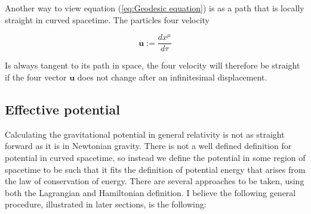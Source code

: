 \documentclass{article}
\begin{document}
Another way to view equation (\ref{eq:Geodesic equation}) is as a path that is locally straight in curved spacetime. The particles four velocity

\begin{equation}\label{eq:Four velocity}
    \boldsymbol{u} := \frac{dx^\mu}{d\tau}
\end{equation}

Is always tangent to its path in space, the four velocity will therefore be straight if the four vector $\boldsymbol{u}$ does not change after an infinitesimal displacement.

    



\subsection{Effective potential}
Calculating the gravitational potential in general relativity is not as straight forward as it is in Newtonian gravity. There is not a well defined definition for potential in curved spacetime, so instead we define the potential in some region of spacetime to be such that it fits the definition of potential energy that arises from the law of conservation of energy. There are several approaches to be taken, using both the Lagrangian and Hamiltonian definition. I believe the following general procedure, illustrated in later sections, is the following:
\end{document}
